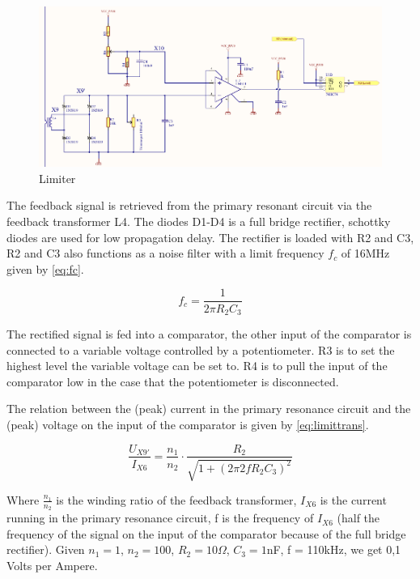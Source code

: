 \begin{figure}[h!]
    \centering
    \includegraphics[width=\textwidth]{Skjema/TK513_Limiter.pdf}
    \caption{Limiter}
    \label{fig:limiter}
\end{figure}

The feedback signal is retrieved from the primary resonant circuit via the feedback transformer L4. The diodes D1-D4 is a full bridge rectifier, schottky diodes are used for low propagation delay. The rectifier is loaded with R2 and C3, R2 and C3 also functions as a noise filter with a limit frequency $f_c$ of 16MHz given by \cref{eq:fc}.

\begin{equation} \label{eq:fc}
    f_c = \frac{1}{2 \pi R_2 C_3}
\end{equation}

The rectified signal is fed into a comparator, the other input of the comparator is connected to a variable voltage controlled by a potentiometer. R3 is to set the highest level the variable voltage can be set to. R4 is to pull the input of the comparator low in the case that the potentiometer is disconnected.

The relation between the (peak) current in the primary resonance circuit and the (peak) voltage on the input of the comparator is given by \cref{eq:limittrans}.

\begin{equation} \label{eq:limittrans}
    \frac{U_{X9'}}{I_{X6}} = \frac{n_1}{n_2} \cdot \frac{R_2}{\sqrt{1+(2 \pi 2 f R_2 C_3)^2}}
\end{equation}


Where $\frac{n_1}{n_2}$ is the winding ratio of the feedback transformer, $I_{X6}$ is the current running in the primary resonance circuit, f is the frequency of $I_{X6}$ (half the frequency of the signal on the input of the comparator because of the full bridge rectifier). Given $n_1 = 1$, $n_2 = 100$, $R_2 = 10\Omega$, $C_3 = 1$nF, f = 110kHz, we get 0,1 Volts per Ampere.

